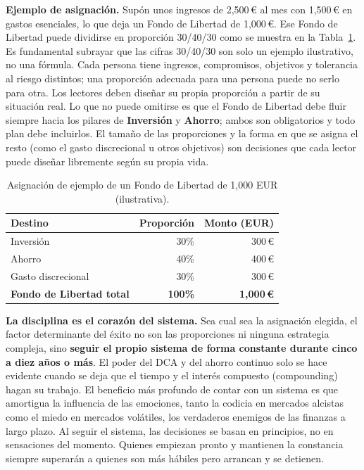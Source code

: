 \documentclass[10pt,a4paper,twocolumn]{article}
\begin{document}
\textbf{Ejemplo de asignaci\'on.} Sup\'on unos ingresos de 2{,}500\,€ al mes con 1{,}500\,€ en gastos esenciales, lo que deja un Fondo de Libertad de 1{,}000\,€. Ese Fondo de Libertad puede dividirse en proporci\'on 30/40/30 como se muestra en la Tabla~\ref{tab:alloc}. Es fundamental subrayar que las cifras 30/40/30 son solo un ejemplo ilustrativo, no una f\'ormula. Cada persona tiene ingresos, compromisos, objetivos y tolerancia al riesgo distintos; una proporci\'on adecuada para una persona puede no serlo para otra. Los lectores deben dise\~nar su propia proporci\'on a partir de su situaci\'on real. Lo que no puede omitirse es que el Fondo de Libertad debe fluir siempre hacia los pilares de \textbf{Inversi\'on} y \textbf{Ahorro}; ambos son obligatorios y todo plan debe incluirlos. El tama\~no de las proporciones y la forma en que se asigna el resto (como el gasto discrecional u otros objetivos) son decisiones que cada lector puede dise\~nar libremente seg\'un su propia vida.

\begin{table}[t]
\centering
\small
\begin{tabular}{lrr}
\toprule
\rowcolor{accent!15}
\textbf{Destino} & \textbf{Proporci\'on} & \textbf{Monto (EUR)} \\
\midrule
Inversi\'on    & 30\% & 300\,€ \\
Ahorro         & 40\% & 400\,€ \\
Gasto discrecional & 30\% & 300\,€ \\
\midrule
\textbf{Fondo de Libertad total} & \textbf{100\%} & \textbf{1{,}000\,€} \\
\bottomrule
\end{tabular}
\caption{Asignaci\'on de ejemplo de un Fondo de Libertad de 1{,}000 EUR (ilustrativa).}
\label{tab:alloc}
\end{table}

\textbf{La disciplina es el coraz\'on del sistema.} Sea cual sea la asignaci\'on elegida, el factor determinante del \'exito no son las proporciones ni ninguna estrategia compleja, sino \textbf{seguir el propio sistema de forma constante durante cinco a diez a\~nos o m\'as}. El poder del DCA y del ahorro continuo solo se hace evidente cuando se deja que el tiempo y el inter\'es compuesto (compounding) hagan su trabajo. El beneficio m\'as profundo de contar con un sistema es que amortigua la influencia de las emociones, tanto la codicia en mercados alcistas como el miedo en mercados vol\'atiles, los verdaderos enemigos de las finanzas a largo plazo. Al seguir el sistema, las decisiones se basan en principios, no en sensaciones del momento. Quienes empiezan pronto y mantienen la constancia siempre superar\'an a quienes son m\'as h\'abiles pero arrancan y se detienen.
\end{document}
